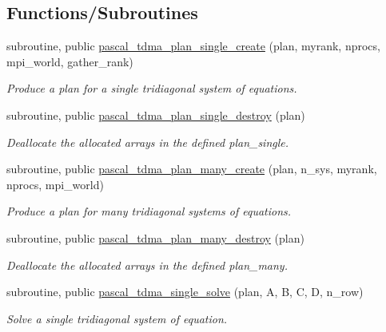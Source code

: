 \subsection*{Functions/\+Subroutines}
\begin{DoxyCompactItemize}
\item 
subroutine, public \mbox{\hyperlink{namespacepascal__tdma_a5dfc2d7c919b47ad364a74d141532a9f}{pascal\+\_\+tdma\+\_\+plan\+\_\+single\+\_\+create}} (plan, myrank, nprocs, mpi\+\_\+world, gather\+\_\+rank)
\begin{DoxyCompactList}\small\item\em Produce a plan for a single tridiagonal system of equations. \end{DoxyCompactList}\item 
subroutine, public \mbox{\hyperlink{namespacepascal__tdma_adb04e59c740ce6c4b9518dd86eaeb594}{pascal\+\_\+tdma\+\_\+plan\+\_\+single\+\_\+destroy}} (plan)
\begin{DoxyCompactList}\small\item\em Deallocate the allocated arrays in the defined plan\+\_\+single. \end{DoxyCompactList}\item 
subroutine, public \mbox{\hyperlink{namespacepascal__tdma_a7e9c24b343ae949044eccc8692dcc6e9}{pascal\+\_\+tdma\+\_\+plan\+\_\+many\+\_\+create}} (plan, n\+\_\+sys, myrank, nprocs, mpi\+\_\+world)
\begin{DoxyCompactList}\small\item\em Produce a plan for many tridiagonal systems of equations. \end{DoxyCompactList}\item 
subroutine, public \mbox{\hyperlink{namespacepascal__tdma_a8438e6774617871b147af9ec8bdad6ce}{pascal\+\_\+tdma\+\_\+plan\+\_\+many\+\_\+destroy}} (plan)
\begin{DoxyCompactList}\small\item\em Deallocate the allocated arrays in the defined plan\+\_\+many. \end{DoxyCompactList}\item 
subroutine, public \mbox{\hyperlink{namespacepascal__tdma_ab14e132231d4b53fd65dd333ccc85a50}{pascal\+\_\+tdma\+\_\+single\+\_\+solve}} (plan, A, B, C, D, n\+\_\+row)
\begin{DoxyCompactList}\small\item\em Solve a single tridiagonal system of equation. \end{DoxyCompactList}\item 

\end{DoxyCompactItemize}
